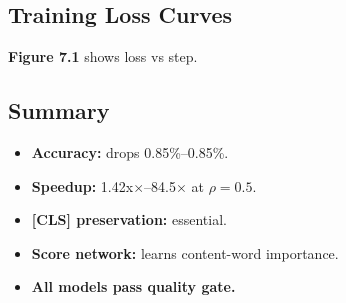 \subsection{Training Loss Curves}

\textbf{Figure 7.1} shows loss vs step.

\subsection{Summary}

\begin{itemize}
\item \textbf{Accuracy:} drops 0.85\%--0.85\%.
\item \textbf{Speedup:} 1.42x$\times$--84.5$\times$ at $\rho = 0.5$.
\item \textbf{[CLS] preservation:} essential.
\item \textbf{Score network:} learns content-word importance.
\item \textbf{All models pass quality gate.}

\end{itemize}
